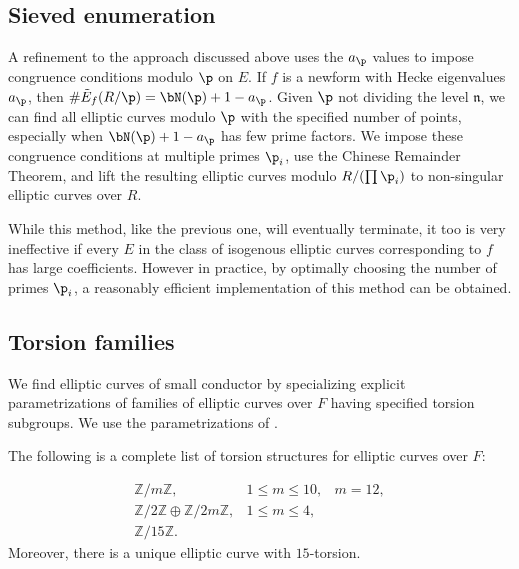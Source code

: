 \documentclass{amsart}
\newcommand{\n}{\mathfrak{n}}
\begin{document}
\subsection{Sieved enumeration}\label{sec:sieve}

A refinement to the approach discussed above uses the $a_\p$ values to impose
congruence conditions modulo $\p$ on $E$.
If $f$ is a newform with Hecke eigenvalues
$a_\p$, then $\#\tilde E_f(R/\p)=\bN(\p)+1-a_{\p}$.
Given $\p$ not dividing the level $\n$, we can find all elliptic curves
modulo $\p$ with the specified number of points, especially when $\bN(\p) +1 - a_\p$ has
few prime factors. We impose these congruence conditions at multiple primes $\p_i$,
use the Chinese Remainder Theorem, and lift the resulting elliptic curves modulo $R/ (\prod \p_i)$
to non-singular elliptic curves over $R$.

While this method, like the previous one, will eventually terminate, it too is very
ineffective if every $E$ in the class of isogenous elliptic curves corresponding to $f$ has
large coefficients. However in practice, by optimally choosing the number of primes $\p_i$, 
a reasonably efficient implementation of this method can be obtained.

\subsection{Torsion families}\label{sec:torsion}
We find elliptic curves of small conductor by specializing explicit parametrizations
of families of elliptic curves over $F$ having specified torsion subgroups.
We use the parametrizations of \cite{kubert:torfam}.

\begin{theorem} The following is
a complete list of torsion structures for elliptic curves over $F$:

$$\begin{array}{lll}
\mathbb{Z}/m\mathbb{Z},   &1 \leq m \leq 10,& m = 12,\\
\mathbb{Z}/2\mathbb{Z} \oplus \mathbb{Z}/2m\mathbb{Z}, &  1 \leq m \leq 4,&\\
\mathbb{Z}/15\mathbb{Z}.&&
\end{array}$$ 
Moreover, there is a unique elliptic curve with $15$-torsion.
\end{theorem}
\end{document}
